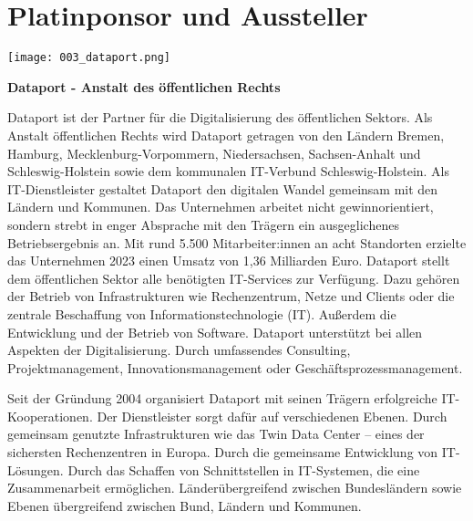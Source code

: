 \clearpage
\section*{Platinponsor und Aussteller}
  \texttt{[image: 003\_dataport.png]}
  \vspace{2.0\baselineskip}
  
\noindent
    {\bfseries Dataport - Anstalt des öffentlichen Rechts}
    \vspace{1.0\baselineskip}
    
\noindent
Dataport ist der Partner für die Digitalisierung des öffentlichen Sektors.
Als Anstalt öffentlichen Rechts wird Dataport getragen von den Ländern Bremen,
Hamburg, Mecklenburg-Vorpommern, Niedersachsen, Sachsen-Anhalt und
Schleswig-Holstein sowie dem kommunalen IT-Verbund Schleswig-Holstein.
Als IT-Dienst\-leister gestaltet Dataport den digitalen Wandel gemeinsam mit
den Ländern und Kommunen.
\newpage
\noindent
Das Unternehmen arbeitet nicht gewinnorientiert, sondern strebt in enger
Absprache mit den Trägern ein ausgeglichenes Betriebsergebnis an.
Mit rund 5.500 Mitarbeiter:innen an acht Standorten erzielte das Unternehmen
2023 einen Umsatz von 1,36 Milliarden Euro. Dataport stellt dem öffentlichen
Sektor alle benötigten IT-Services zur Verfügung. Dazu gehören der Betrieb
von Infrastrukturen wie Rechenzentrum, Netze und Clients oder die zentrale
Beschaffung von Informationstechnologie (IT). Außerdem die Entwicklung und
der Betrieb von Software. Dataport unterstützt bei allen Aspekten der Digitalisierung.
Durch umfassendes Consulting, Projektmanagement, Innovationsmanagement
oder Geschäftsprozessmanagement.

\noindent
Seit der Gründung 2004 organisiert Dataport mit seinen Trägern erfolgreiche
IT-Kooperationen. Der Dienstleister sorgt dafür auf verschiedenen Ebenen.
Durch gemeinsam genutzte Infrastrukturen wie das Twin Data Center – eines
der sichersten Rechenzentren in Europa. Durch die gemeinsame Entwicklung
von IT-Lösungen. Durch das Schaffen von Schnittstellen in IT-Systemen, die
eine Zusammenarbeit ermöglichen. Länderübergreifend zwischen Bundesländern
sowie Ebenen übergreifend zwischen Bund, Ländern und Kommunen.

